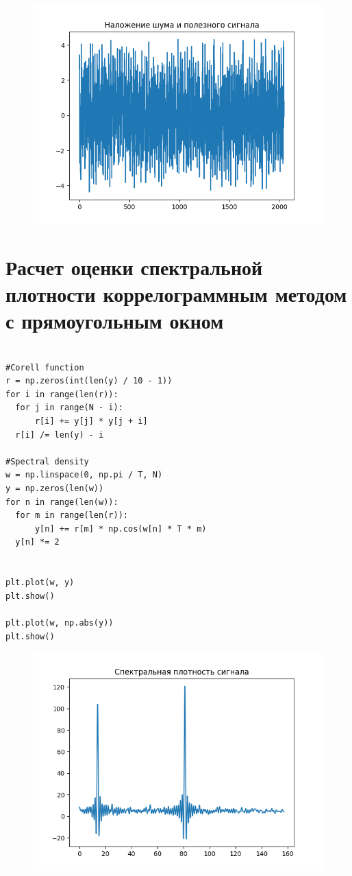 \documentclass[12pt]{article}
\begin{document}
\begin{figure}[!htb]
\centering
\includegraphics[scale=1.00]{ugly.png}
\caption{}
\label{}
\end{figure}


\section{Расчет оценки спектральной плотности коррелограммным методом с прямоугольным окном}




\begin{lstlisting}

#Corell function
r = np.zeros(int(len(y) / 10 - 1))
for i in range(len(r)):
  for j in range(N - i):
      r[i] += y[j] * y[j + i]
  r[i] /= len(y) - i

#Spectral density
w = np.linspace(0, np.pi / T, N)
y = np.zeros(len(w))
for n in range(len(w)):
  for m in range(len(r)):
      y[n] += r[m] * np.cos(w[n] * T * m)
  y[n] *= 2


plt.plot(w, y)
plt.show()

plt.plot(w, np.abs(y))
plt.show()
\end{lstlisting}


\begin{figure}[!htb]
\centering
\includegraphics[scale=1.00]{sig_spectral_density.png}
\caption{}
\label{}
\end{figure}
\end{document}
